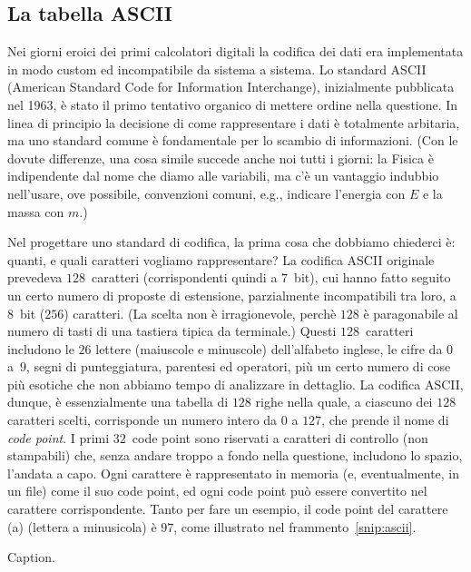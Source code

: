 \subsection{La tabella ASCII}

Nei giorni eroici dei primi calcolatori digitali la codifica dei dati era implementata
in modo custom ed incompatibile da sistema a sistema. Lo standard ASCII (American
Standard Code for Information Interchange), inizialmente pubblicata nel 1963, \`e stato
il primo tentativo organico di mettere ordine nella questione. In linea di principio
la decisione di come rappresentare i dati \`e totalmente arbitaria, ma uno standard
comune \`e fondamentale per lo scambio di informazioni. (Con le dovute differenze,
una cosa simile succede anche noi tutti i giorni: la Fisica \`e indipendente dal
nome che diamo alle variabili, ma c'\`e un vantaggio indubbio nell'usare, ove possibile,
convenzioni comuni, e.g., indicare l'energia con $E$ e la massa con $m$.)

Nel progettare uno standard di codifica, la prima cosa che dobbiamo chiederci \`e:
quanti, e quali caratteri vogliamo rappresentare? La codifica ASCII originale prevedeva
$128$~caratteri (corrispondenti quindi a $7$~bit), cui hanno fatto seguito un certo
numero di proposte di estensione, parzialmente incompatibili tra loro, a $8$~bit
($256$) caratteri. (La scelta non \`e irragionevole, perch\`e $128$ \`e paragonabile
al numero di tasti di una tastiera tipica da terminale.) Questi $128$~caratteri includono
le $26$ lettere (maiuscole e minuscole) dell'alfabeto inglese, le cifre da $0$ a~$9$,
segni di punteggiatura, parentesi ed operatori, pi\`u un certo numero di cose pi\`u
esotiche che non abbiamo tempo di analizzare in dettaglio. La codifica ASCII, dunque,
\`e essenzialmente una tabella di $128$ righe nella quale, a ciascuno dei $128$ caratteri
scelti, corrisponde un numero intero da $0$ a $127$, che prende il nome di \emph{code point}.
I primi $32$~code point sono riservati a caratteri di controllo (non stampabili) che,
senza andare troppo a fondo nella questione, includono lo spazio, l'andata a capo.
Ogni carattere \`e rappresentato in memoria (e, eventualmente, in un file) come il
suo code point, ed ogni code point pu\`o essere convertito nel carattere corrispondente.
Tanto per fare un esempio, il code point del carattere \cchar(a) (lettera a minusicola)
\`e $97$, come illustrato nel frammento~\ref{snip:ascii}.


\begin{table}[htbp!]
  
  \caption{Caption.}
\end{table}

